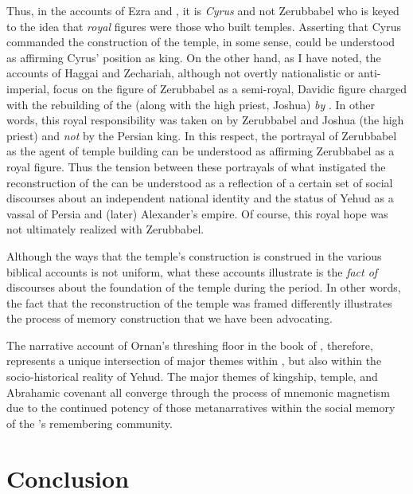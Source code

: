 Thus, in the accounts of Ezra and \chronicler, it is \emph{Cyrus} and not Zerubbabel who is keyed to the idea that \emph{royal} figures were those who built temples. Asserting that Cyrus commanded the construction of the temple, in some sense, could be understood as affirming Cyrus' position as king. On the other hand, as I have noted, the accounts of Haggai and Zechariah, although not overtly nationalistic or anti-imperial, focus on the figure of Zerubbabel as a semi-royal, Davidic figure charged with the rebuilding of the \temple (along with the high priest, Joshua) \emph{by \yahweh}. In other words, this royal responsibility was taken on by Zerubbabel and Joshua (the high priest) and \emph{not} by the Persian king. In this respect, the portrayal of Zerubbabel as the agent of temple building can be understood as affirming Zerubbabel as a royal figure. Thus the tension between these portrayals of what instigated the reconstruction of the \temple can be understood as a reflection of a certain set of social discourses about an independent national identity and the status of Yehud as a vassal of Persia and (later) Alexander's empire. Of course, this royal hope was not ultimately realized with Zerubbabel.

Although the ways that the temple's construction is construed in the various biblical accounts is not uniform, what these accounts illustrate is the \emph{fact of} discourses about the foundation of the temple during the \secondtemple period. In other words, the fact that the reconstruction of the temple was framed differently illustrates the process of memory construction that we have been advocating.

The narrative account of Ornan's threshing floor in the book of \chronicles, therefore, represents a unique intersection of major themes within \chronicles, but also within the socio-historical reality of \secondtemple Yehud. The major themes of kingship, temple, and Abrahamic covenant all converge through the process of mnemonic magnetism due to the continued potency of those metanarratives within the social memory of the \chronicler's remembering community.

\section{Conclusion}

